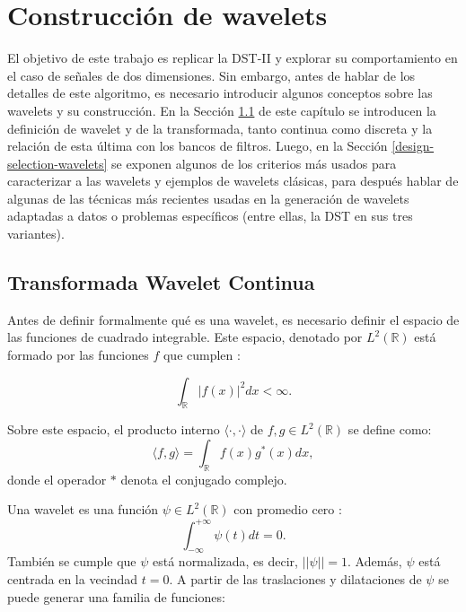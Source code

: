 \chapter{Construcción de wavelets}\label{chapter:state-of-the-art}

El objetivo de este trabajo es replicar la DST-II y explorar su comportamiento en el caso de señales de dos 
dimensiones. Sin embargo, antes de hablar de los detalles de este algoritmo, es necesario introducir
algunos conceptos sobre las wavelets y su construcción. En la Sección \ref{wavelet-transform} 
de este capítulo se introducen la definición de wavelet
y de la transformada, tanto continua como discreta y la relación de esta última con los bancos de filtros. Luego, en
la Sección \ref{design-selection-wavelets} se exponen algunos 
de los criterios más usados para caracterizar a las wavelets y ejemplos de wavelets clásicas, para después 
hablar de algunas de las técnicas más recientes usadas en la generación de wavelets adaptadas a datos o problemas
específicos (entre ellas, la DST en sus tres variantes).

\section{Transformada Wavelet Continua }\label{wavelet-transform}

Antes de definir formalmente qué es una wavelet, es necesario definir el espacio de las funciones 
de cuadrado integrable.
Este espacio, denotado por $L^2(\mathbb{R})$ está formado por las funciones $f$ que cumplen \cite{frazier}:

\begin{equation}
	\int_{\mathbb{R}} |f(x)|^2 dx < \infty.
\end{equation}

Sobre este espacio, el producto interno $\langle \cdot,\cdot \rangle$ de $f,g \in L^2(\mathbb{R})$ se define como:
\begin{equation}
	\langle f,g \rangle = \int_{\mathbb{R}} f(x)g^*(x) dx,
\end{equation}
\noindent donde el operador $*$ denota el conjugado complejo.

Una wavelet es una función $\psi \in L^2(\mathbb{R})$ con promedio cero \cite{Mallat2008}:
\begin{equation}
	\int_{-\infty}^{+\infty} \psi(t) dt = 0.
\end{equation}
También se cumple que $\psi$ está normalizada, es decir, $||\psi||=1$. Además, $\psi$ está centrada en la vecindad
$t=0$. A partir de las traslaciones y dilataciones de $\psi$ se puede generar una familia de funciones:

